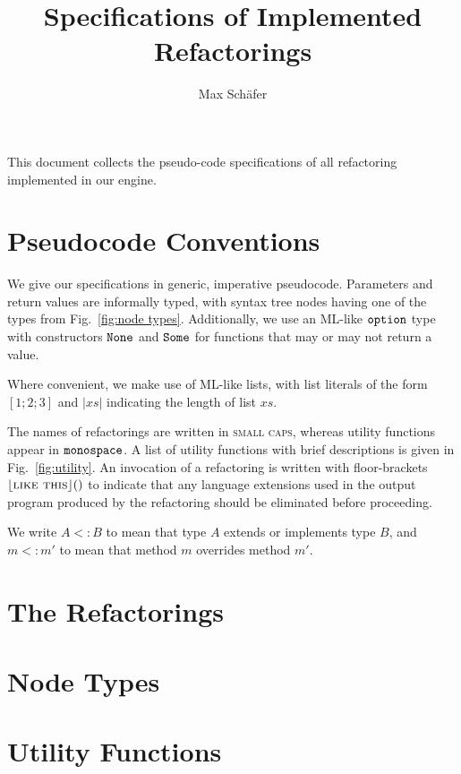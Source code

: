 \documentclass{article}
\title{Specifications of Implemented Refactorings}
\author{Max Sch\"afer}
\newcommand{\refactoring}[1]{\textsc{#1}}
\newcommand{\util}[1]{\ensuremath{\text{\texttt{#1}}}}
\begin{document}
\maketitle

This document collects the pseudo-code specifications of all refactoring implemented in our engine.

\section{Pseudocode Conventions}
We give our specifications in generic, imperative pseudocode. Parameters and return values are informally typed, with syntax tree nodes having one of the types from Fig.~\ref{fig:node types}. Additionally, we use an ML-like \util{option} type with constructors \util{None} and \util{Some} for functions that may or may not return a value.

Where convenient, we make use of ML-like lists, with list literals of the form $[1; 2; 3]$ and $|xs|$ indicating the length of list $xs$.

The names of refactorings are written in \refactoring{small caps}, whereas utility functions appear in \util{monospace}. A list of utility functions with brief descriptions is given in Fig.~\ref{fig:utility}. An invocation of a refactoring is written with floor-brackets $\lfloor\refactoring{like this}\rfloor()$ to indicate that any language extensions used in the output program produced by the refactoring should be eliminated before proceeding.

We write $A<:B$ to mean that type $A$ extends or implements type $B$, and $m<:m'$ to mean that method $m$ overrides method $m'$.

\section{The Refactorings}
























\section{Node Types}


\section{Utility Functions}

\end{document}
